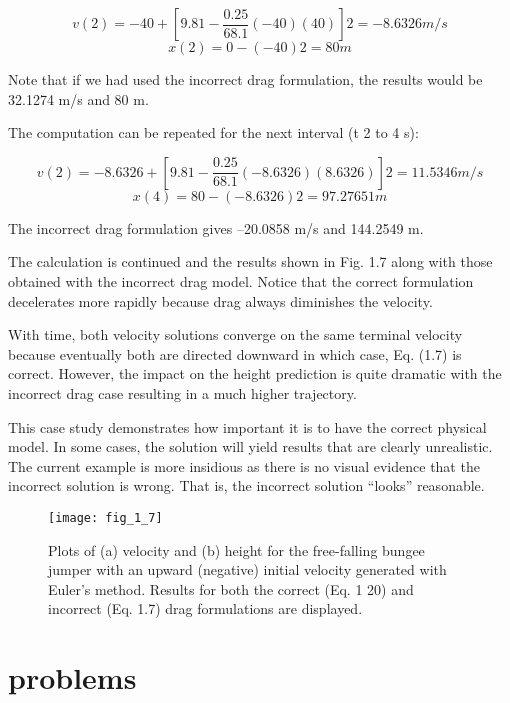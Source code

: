 \documentclass[../main.tex]{subfiles}
\begin{document}
$$v(2)= -40 + \left[ 9.81 - \dfrac{0.25}{68.1}(-40)(40) \right]2= -8.6326 m/s $$
$$x(2)=0 - (-40)2=80 m$$

 Note that if we had used the incorrect drag formulation, the results would be 32.1274 m/s
and 80 m. 

The computation can be repeated for the next interval (t  2 to 4 s):

$$v(2)= -8.6326 + \left[ 9.81 - \dfrac{0.25}{68.1}(-8.6326)(8.6326) \right]2= 11.5346 m/s $$
$$x(4) =80 -(-8.6326)2=97.27651 m $$


The incorrect drag formulation gives –20.0858 m/s and 144.2549 m.


The calculation is continued and the results shown in Fig. 1.7 along with those
obtained with the incorrect drag model. Notice that the correct formulation decelerates
more rapidly because drag always diminishes the velocity.


With time, both velocity solutions converge on the same terminal velocity because
eventually both are directed downward in which case, Eq. (1.7) is correct. However, the
impact on the height prediction is quite dramatic with the incorrect drag case resulting in a
much higher trajectory.


This case study demonstrates how important it is to have the correct physical model.
In some cases, the solution will yield results that are clearly unrealistic. The current example is more insidious as there is no visual evidence that the incorrect solution is wrong. That
is, the incorrect solution “looks” reasonable.

\begin{figure}[H]
	\centering
	\texttt{[image: fig\_1\_7]}
   \caption{\textsf{Plots of (a) velocity and (b) height for the free-falling bungee jumper with an upward (negative)
   initial velocity generated with Euler's method. Results for both the correct (Eq. 1 20) and incorrect
   (Eq. 1.7) drag formulations are displayed.}}
   \label{fig_1.}
\end{figure}

\section*{problems}
\end{document}
